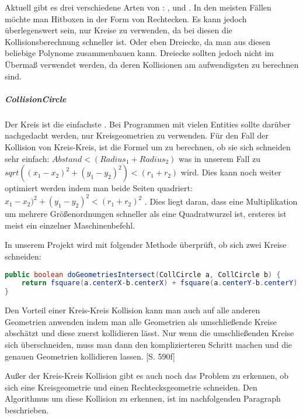 Aktuell gibt es drei verschiedene Arten von : ,  und . In den meisten Fällen möchte man Hitboxen in der Form von Rechtecken. Es kann jedoch überlegenswert sein, nur Kreise zu verwenden, da bei diesen die Kollisionsberechnung schneller ist. Oder eben Dreiecke, da man aus diesen beliebige Polynome zusammenbauen kann. Dreiecke sollten jedoch nicht im Übermaß verwendet werden, da deren Kollisionen am aufwendigsten zu berechnen sind.

\subparagraph{CollisionCircle}

Der Kreis ist die einfachste . Bei Programmen mit vielen Entities sollte darüber nachgedacht werden, nur Kreisgeometrien zu verwenden.
Für den Fall der Kollision von Kreis-Kreis, ist die Formel um zu berechnen, ob sie sich schneiden sehr einfach:
$ Abstand < (Radius_1 + Radius_2) $ was in unserem Fall zu $ sqrt((x_1 - x_2)^2 + (y_1 - y_2)^2) < (r_1 + r_2)$ wird. Dies kann noch weiter optimiert werden indem man beide Seiten quadriert: $ x_1 - x_2)^2 + (y_1 - y_2)^2 < (r_1 + r_2)^2 $ \cite[S 499]{DGIJ}. Dies liegt daran, dass eine Multiplikation um mehrere Größenordnungen schneller als eine Quadratwurzel ist, ersteres ist meist ein einzelner Maschinenbefehl.

In unserem Projekt wird mit folgender Methode überprüft, ob sich zwei Kreise schneiden:

\doinline
\begin{lstlisting}[caption=Erkennen von Kollisionen (Kreis-Kreis), title=\hspace{0 pt}, language=java]
public boolean doGeometriesIntersect(CollCircle a, CollCircle b) {
	return fsquare(a.centerX-b.centerX) + fsquare(a.centerY-b.centerY) < fsquare(a.radius + b.radius);
}
\end{lstlisting}

Den Vorteil einer Kreis-Kreis Kollision kann man auch auf alle anderen Geometrien anwenden indem man alle Geometrien als umschließende Kreise abschätzt und diese zuerst kollidieren lässt. Nur wenn die umschließenden Kreise sich überschneiden, muss man dann den komplizierteren Schritt machen und die genauen Geometrien kollidieren lassen. \cite{EMFGAIA}[S. 590f]

Außer der Kreis-Kreis Kollision gibt es auch noch das Problem zu erkennen, ob sich eine Kreisgeometrie und einen Rechtecksgeometrie schneiden.
Den Algorithmus um diese Kollision zu erkennen, ist im nachfolgenden Paragraph  beschrieben.

